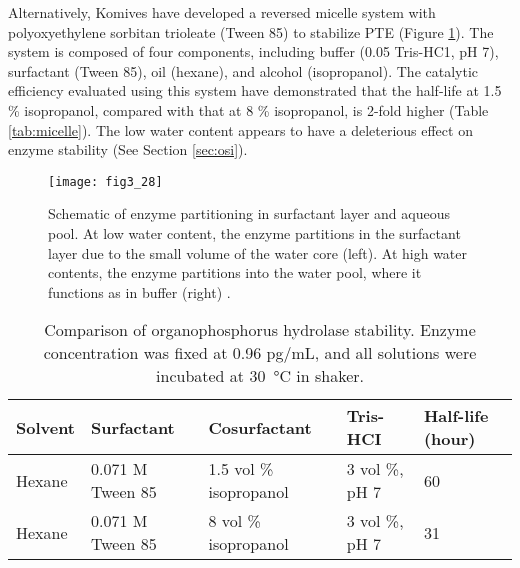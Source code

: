 \begin{refsection}
Alternatively, Komives  have developed a reversed micelle system
with polyoxyethylene sorbitan trioleate (Tween 85) to stabilize PTE
\cite{Komives1994} (Figure \ref{fig:micelles}). The system is composed of
four components, including buffer (\SI{0.05}{\Molar} Tris-HC1, pH 7),
surfactant (Tween 85), oil (hexane), and alcohol (isopropanol). The catalytic
efficiency evaluated using this system have demonstrated that the half-life at
1.5 \% isopropanol, compared with that at 8 \% isopropanol, is 2-fold higher
\cite{Komives1994} (Table \ref{tab:micelle}).  The low water content appears to
have a deleterious effect on enzyme stability (See Section \ref{sec:osi}). 
\begin{figure}[htbp] \centering \texttt{[image: fig3\_28]}
    \caption[Schematic of enzyme partitioning in surfactant layer and aqueous
    pool. At low water content, the enzyme partitions in the surfactant layer
due to the small volume of the water core (left). At high water contents, the
enzyme partitions into the water pool, where it functions as in buffer
(right).] {Schematic of enzyme partitioning in surfactant layer and aqueous
    pool. At low water content, the enzyme partitions in the surfactant layer
    due to the small volume of the water core (left). At high water contents,
    the enzyme partitions into the water pool, where it functions as in buffer
    (right) \cite{Komives1994}.}
    \label{fig:micelles}
\end{figure}
\begin{table}[htbp]
    \centering
    \caption[Comparison of organophosphorus hydrolase stability. Enzyme
    concentration was fixed at 0.96 pg/mL, and all solutions were incubated at
\SI{30}{\celsius} in shaker.] {Comparison of organophosphorus hydrolase
    stability. Enzyme concentration was fixed at 0.96 pg/mL, and all solutions
    were incubated at \SI{30}{\celsius} in shaker.} 
    \begin{tabular}{lllll}
    \hline

    Solvent & Surfactant & Cosurfactant & Tris-HCI & Half-life (hour) \\
    \hline

    Hexane & 0.071 M Tween 85 & 1.5 vol \% isopropanol & 3 vol \%, pH 7 & 60 \\
    Hexane & 0.071 M Tween 85 & 8 vol \% isopropanol & 3 vol \%, pH 7 & 31 \\


\end{tabular}
\end{table}
\end{refsection}

